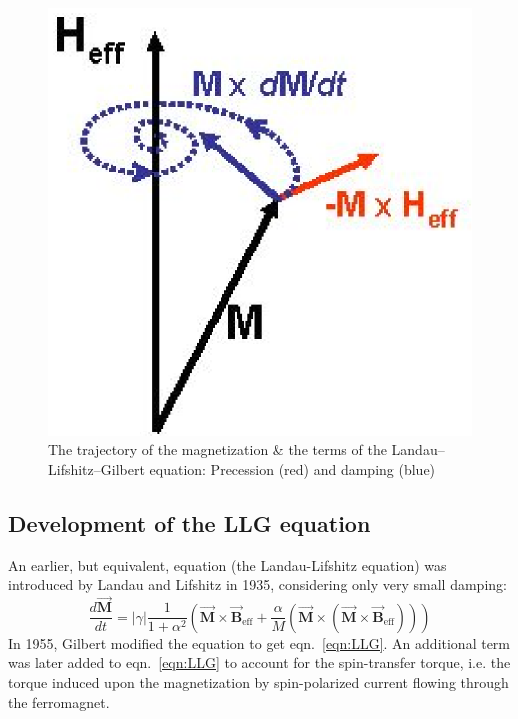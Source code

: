 {{			\begin{figure}[H]
				\begin{center}
					\includegraphics[scale=1]{me20b178_2.eps}
				\end{center}
				\caption{The trajectory of the magnetization \& the terms of the Landau–Lifshitz–Gilbert equation: Precession (red) and damping (blue)}
				\label{fig:damped_magnetic_precession} 
			\end{figure}
		}

		\subsection{Development of the LLG equation}
		{
			\vspace{0.25cm}
			\large
			An earlier, but equivalent, equation (the Landau-Lifshitz equation) was introduced by Landau and Lifshitz in 1935, considering only very small damping:
			\begin{equation}
				\frac{d\overrightarrow{\mathbf{M}}}{dt}=|\gamma| \frac{1}{1+\alpha^{2}}\left(\overrightarrow{\mathbf{M}} \times \overrightarrow{\mathbf{B}}_{\mathrm{eff}}+\frac{\alpha}{M}\left(\overrightarrow{\mathbf{M}} \times\left(\overrightarrow{\mathbf{M}} \times \overrightarrow{\mathbf{B}}_{\mathrm{eff}}\right)\right)\right)
				\label{eqn:LL}
			\end{equation}
			In 1955, Gilbert modified the equation to get eqn.~\ref{eqn:LLG}.
			\newline
			\newline
			An additional term was later added to eqn.~\ref{eqn:LLG} to account for the spin-transfer torque, i.e. the torque induced upon the magnetization by spin-polarized current flowing through the ferromagnet.
		}
	}
